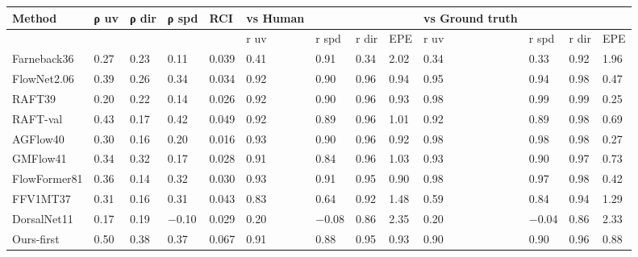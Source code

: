 \begin{tabular}{lllllllllllll}
\toprule
Method & ρ uv & ρ dir & ρ spd & RCI & vs Human &  &  &  & vs Ground truth &  &  &  \\
\midrule
 &  &  &  &  & r uv & r spd & r dir & EPE & r uv & r spd & r dir & EPE \\
Farneback36 & 0.27 & 0.23 & 0.11 & 0.039 & 0.41 & 0.91 & 0.34 & 2.02 & 0.34 & 0.33 & 0.92 & 1.96 \\
FlowNet2.06 & 0.39 & 0.26 & 0.34 & 0.034 & 0.92 & 0.90 & 0.96 & 0.94 & 0.95 & 0.94 & 0.98 & 0.47 \\
RAFT39 & 0.20 & 0.22 & 0.14 & 0.026 & 0.92 & 0.90 & 0.96 & 0.93 & 0.98 & 0.99 & 0.99 & 0.25 \\
RAFT-val & 0.43 & 0.17 & 0.42 & 0.049 & 0.92 & 0.89 & 0.96 & 1.01 & 0.92 & 0.89 & 0.98 & 0.69 \\
AGFlow40 & 0.30 & 0.16 & 0.20 & 0.016 & 0.93 & 0.90 & 0.96 & 0.92 & 0.98 & 0.98 & 0.98 & 0.27 \\
GMFlow41 & 0.34 & 0.32 & 0.17 & 0.028 & 0.91 & 0.84 & 0.96 & 1.03 & 0.93 & 0.90 & 0.97 & 0.73 \\
FlowFormer81 & 0.36 & 0.14 & 0.32 & 0.030 & 0.93 & 0.91 & 0.95 & 0.90 & 0.98 & 0.97 & 0.98 & 0.42 \\
FFV1MT37 & 0.31 & 0.16 & 0.31 & 0.043 & 0.83 & 0.64 & 0.92 & 1.48 & 0.59 & 0.84 & 0.94 & 1.29 \\
DorsalNet11 & 0.17 & 0.19 & −0.10 & 0.029 & 0.20 & −0.08 & 0.86 & 2.35 & 0.20 & −0.04 & 0.86 & 2.33 \\
Ours-first & 0.50 & 0.38 & 0.37 & 0.067 & 0.91 & 0.88 & 0.95 & 0.93 & 0.90 & 0.90 & 0.96 & 0.88 \\
\bottomrule
\end{tabular}
